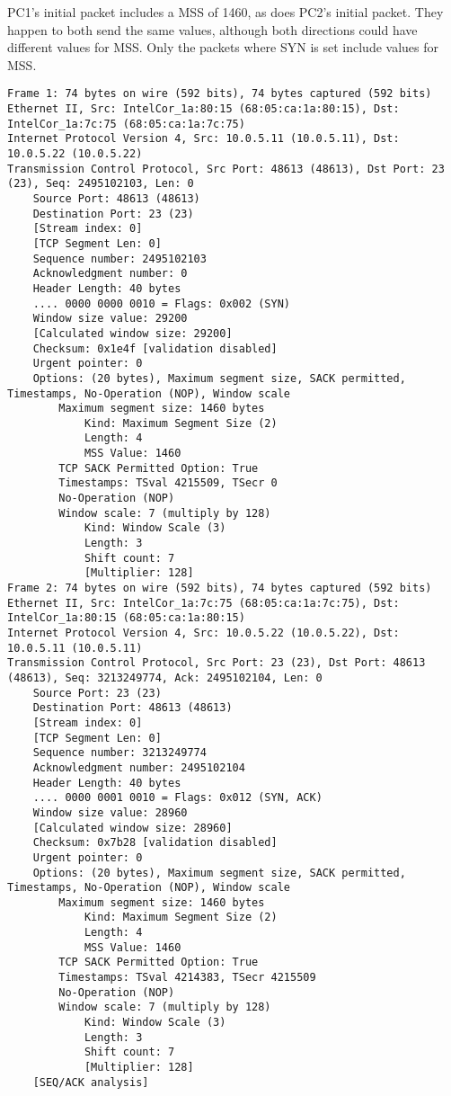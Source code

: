 PC1's initial packet includes a MSS of 1460, as does PC2's initial packet. They happen to both send the same values, although both directions could have different values for MSS. Only the packets where SYN is set include values for MSS.

\begin{lstlisting}
Frame 1: 74 bytes on wire (592 bits), 74 bytes captured (592 bits)
Ethernet II, Src: IntelCor_1a:80:15 (68:05:ca:1a:80:15), Dst: IntelCor_1a:7c:75 (68:05:ca:1a:7c:75)
Internet Protocol Version 4, Src: 10.0.5.11 (10.0.5.11), Dst: 10.0.5.22 (10.0.5.22)
Transmission Control Protocol, Src Port: 48613 (48613), Dst Port: 23 (23), Seq: 2495102103, Len: 0
    Source Port: 48613 (48613)
    Destination Port: 23 (23)
    [Stream index: 0]
    [TCP Segment Len: 0]
    Sequence number: 2495102103
    Acknowledgment number: 0
    Header Length: 40 bytes
    .... 0000 0000 0010 = Flags: 0x002 (SYN)
    Window size value: 29200
    [Calculated window size: 29200]
    Checksum: 0x1e4f [validation disabled]
    Urgent pointer: 0
    Options: (20 bytes), Maximum segment size, SACK permitted, Timestamps, No-Operation (NOP), Window scale
        Maximum segment size: 1460 bytes
            Kind: Maximum Segment Size (2)
            Length: 4
            MSS Value: 1460
        TCP SACK Permitted Option: True
        Timestamps: TSval 4215509, TSecr 0
        No-Operation (NOP)
        Window scale: 7 (multiply by 128)
            Kind: Window Scale (3)
            Length: 3
            Shift count: 7
            [Multiplier: 128]
Frame 2: 74 bytes on wire (592 bits), 74 bytes captured (592 bits)
Ethernet II, Src: IntelCor_1a:7c:75 (68:05:ca:1a:7c:75), Dst: IntelCor_1a:80:15 (68:05:ca:1a:80:15)
Internet Protocol Version 4, Src: 10.0.5.22 (10.0.5.22), Dst: 10.0.5.11 (10.0.5.11)
Transmission Control Protocol, Src Port: 23 (23), Dst Port: 48613 (48613), Seq: 3213249774, Ack: 2495102104, Len: 0
    Source Port: 23 (23)
    Destination Port: 48613 (48613)
    [Stream index: 0]
    [TCP Segment Len: 0]
    Sequence number: 3213249774
    Acknowledgment number: 2495102104
    Header Length: 40 bytes
    .... 0000 0001 0010 = Flags: 0x012 (SYN, ACK)
    Window size value: 28960
    [Calculated window size: 28960]
    Checksum: 0x7b28 [validation disabled]
    Urgent pointer: 0
    Options: (20 bytes), Maximum segment size, SACK permitted, Timestamps, No-Operation (NOP), Window scale
        Maximum segment size: 1460 bytes
            Kind: Maximum Segment Size (2)
            Length: 4
            MSS Value: 1460
        TCP SACK Permitted Option: True
        Timestamps: TSval 4214383, TSecr 4215509
        No-Operation (NOP)
        Window scale: 7 (multiply by 128)
            Kind: Window Scale (3)
            Length: 3
            Shift count: 7
            [Multiplier: 128]
    [SEQ/ACK analysis]
\end{lstlisting}